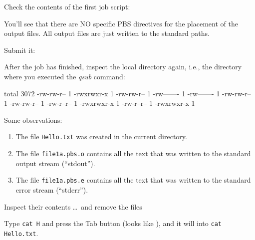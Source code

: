 Check the contents of the first job script:


You'll see that there are NO specific PBS directives for the placement of the output files. All output files are
just written to the standard paths.

Submit it:

\begin{prompt}
\end{prompt}

After the job has finished, inspect the local directory again, i.e., the
directory where you executed the \emph{qsub} command:

\begin{prompt}
total 3072
-rw-rw-r-- 1 %
-rwxrwxr-x 1 %
-rw-rw-r-- 1 %
-rw------- 1 %
-rw------- 1 %
-rw-rw-r-- 1 %
-rw-rw-r-- 1 %
-rw-r--r-- 1 %
-rwxrwxr-x 1 %
-rw-r--r-- 1 %
-rwxrwxr-x 1 %
\end{prompt}

Some observations:
\begin{enumerate}
\item The file \texttt{Hello.txt} was created in the current directory.
\item The file \texttt{file1a.pbs.o\jobnumber} contains all the text that was written to the standard output stream (``stdout'').
\item The file \texttt{file1a.pbs.e\jobnumber} contains all the text that was written to the standard error stream (``stderr'').
\end{enumerate}

Inspect their contents \dots\ and remove the files

\begin{prompt}
\end{prompt}

\begin{tip}
Type \lstinline|cat H| and press the Tab button (looks like \keys{\tab}), and it will
 into \lstinline|cat Hello.txt|.
\end{tip}


